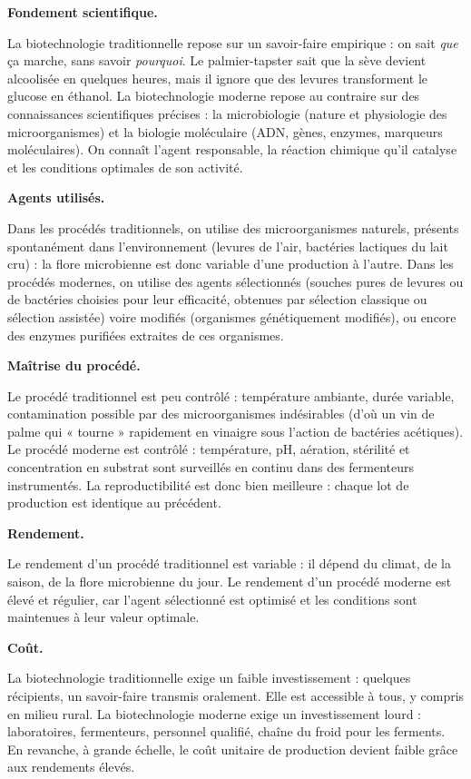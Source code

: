 \documentclass[11pt]{article}
\newcommand{\cle}[1]{{\popxbold\color{popdark}#1}}
\begin{document}
\textbf{Fondement scientifique.}\par
La biotechnologie traditionnelle repose sur un savoir-faire \cle{empirique} : on sait \emph{que} ça marche, sans savoir \emph{pourquoi}. Le palmier-tapster sait que la sève devient alcoolisée en quelques heures, mais il ignore que des levures transforment le glucose en éthanol. La biotechnologie moderne repose au contraire sur des connaissances scientifiques précises : la \cle{microbiologie} (nature et physiologie des microorganismes) et la \cle{biologie moléculaire} (ADN, gènes, enzymes, marqueurs moléculaires). On connaît l'agent responsable, la réaction chimique qu'il catalyse et les conditions optimales de son activité.

\textbf{Agents utilisés.}\par
Dans les procédés traditionnels, on utilise des microorganismes \cle{naturels}, présents spontanément dans l'environnement (levures de l'air, bactéries lactiques du lait cru) : la flore microbienne est donc variable d'une production à l'autre. Dans les procédés modernes, on utilise des agents \cle{sélectionnés} (souches pures de levures ou de bactéries choisies pour leur efficacité, obtenues par sélection classique ou sélection assistée) voire \cle{modifiés} (organismes génétiquement modifiés), ou encore des \cle{enzymes purifiées} extraites de ces organismes.

\textbf{Maîtrise du procédé.}\par
Le procédé traditionnel est peu contrôlé : température ambiante, durée variable, contamination possible par des microorganismes indésirables (d'où un vin de palme qui « tourne » rapidement en vinaigre sous l'action de bactéries acétiques). Le procédé moderne est \cle{contrôlé} : température, pH, aération, stérilité et concentration en substrat sont surveillés en continu dans des fermenteurs instrumentés. La reproductibilité est donc bien meilleure : chaque lot de production est identique au précédent.

\textbf{Rendement.}\par
Le rendement d'un procédé traditionnel est \cle{variable} : il dépend du climat, de la saison, de la flore microbienne du jour. Le rendement d'un procédé moderne est \cle{élevé et régulier}, car l'agent sélectionné est optimisé et les conditions sont maintenues à leur valeur optimale.

\textbf{Coût.}\par
La biotechnologie traditionnelle exige un \cle{faible investissement} : quelques récipients, un savoir-faire transmis oralement. Elle est accessible à tous, y compris en milieu rural. La biotechnologie moderne exige un \cle{investissement lourd} : laboratoires, fermenteurs, personnel qualifié, chaîne du froid pour les ferments. En revanche, à grande échelle, le coût unitaire de production devient faible grâce aux rendements élevés.
\end{document}
